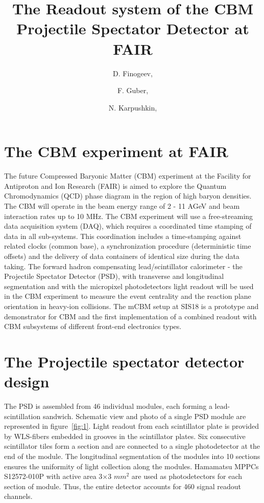 \documentclass[a4paper,11pt]{article}
\title{The Readout system of the CBM Projectile Spectator Detector at FAIR}
\author[a,c,1]{D. Finogeev,\note{Corresponding author.}}
\author[a,b]{F. Guber,}
\author[a]{N. Karpushkin,}
\affiliation[a]{Institute for Nuclear Research RAS, Moscow, Russia,}
\affiliation[b]{Moscow Institute of Physics and Technology, Dolgoprudny, Moscow Region, Russia}
\affiliation[c]{National Research Nuclear University MEPhI, Moscow, Russia}
\affiliation[d]{ Joint Institute for Nuclear Research, Dubna, Russia}
\begin{document}
\maketitle
\flushbottom

\section{The CBM experiment at FAIR}
\label{sec:intro}
The future Compressed Baryonic Matter (CBM) experiment at the Facility for Antiproton and Ion Research (FAIR) is aimed to explore the Quantum Chromodynamics (QCD) phase diagram in the region of high baryon densities. The CBM will operate in the beam energy range of 2 - 11 AGeV and beam interaction rates up to 10 MHz. The CBM experiment will use a free-streaming data acquisition system (DAQ), which requires a coordinated time stamping of data in all sub-systems. This coordination includes a time-stamping against related clocks (common base), a synchronization procedure (deterministic time offsets) and the delivery of data containers of identical size during the data taking. The forward hadron compensating lead/scintillator calorimeter - the Projectile Spectator Detector (PSD), with transverse and longitudinal segmentation and with the micropixel photodetectors light readout will be used in the CBM experiment to measure the event centrality and the reaction plane orientation in heavy-ion collisions. The mCBM setup at SIS18 is a prototype and demonstrator for CBM and the first implementation of a combined readout with CBM subsystems of different front-end electronics types.


\section{The Projectile spectator detector design}
The PSD is assembled from 46 individual modules, each forming a lead-scintillation sandwich. Schematic view and photo of a single PSD module are represented in figure~\ref{fig:1}. Light readout from each scintillator plate is provided by WLS-fibers embedded in grooves in the scintillator plates. Six consecutive scintillator tiles form a section and are connected to a single photodetector at the end of the module. The longitudinal segmentation of the modules into 10 sections ensures the uniformity of light collection along the modules. Hamamatsu MPPCs S12572-010P with active area 3$\times$3 $mm^2$ are used as photodetectors for each section of module. 
Thus, the entire detector accounts for 460 signal readout channels.
\end{document}
